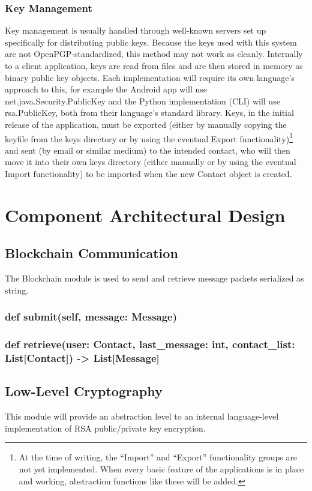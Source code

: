 \documentclass[titlepage]{report}
\begin{document}
\subsubsection{Key Management}
Key management is usually handled through well-known servers set up specifically for distributing public keys. Because the keys used with this system are not OpenPGP-standardized, this method may not work as cleanly. Internally to a client application, keys are read from files and are then stored in memory as binary public key objects. Each implementation will require its own language's approach to this, for example the Android app will use net.java.Security.PublicKey and the Python implementation (CLI) will use rsa.PublicKey, both from their language's standard library. Keys, in the initial release of the application, must be exported (either by manually copying the keyfile from the keys directory or by using the eventual Export functionality)\footnote{At the time of writing, the ``Import'' and ``Export'' functionality groups are not yet implemented. When every basic feature of the applications is in place and working, abstraction functions like these will be added.} and sent (by email or similar medium) to the intended contact, who will then move it into their own keys directory (either manually or by using the eventual Import functionality) to be imported when the new Contact object is created.

\section{Component Architectural Design}

\subsection{Blockchain Communication}
The Blockchain module is used to send and retrieve message packets serialized as string.

\subsubsection{def submit(self, message: Message)}
\subsubsection{def retrieve(user: Contact, last\_message: int, contact\_list: List[Contact]) -> List[Message]}

\subsection{Low-Level Cryptography}
This module will provide an abstraction level to an internal language-level implementation of RSA public/private key encryption.
\end{document}
